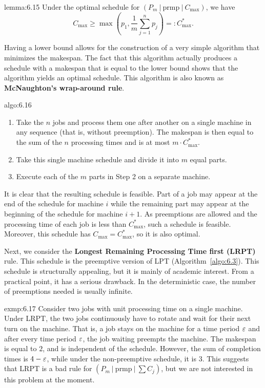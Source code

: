 \begin{lemma}{lemma:6.15}
    Under the optimal schedule for $(P_m~|~\text{prmp}~|~C_{\max})$, we have 
    \[ C_{\max} \geq \max\left( p_1, \frac1m \sum_{j=1}^n p_j \right) 
    =: C^*_{\max}. \] 
\end{lemma}

Having a lower bound allows for the construction of a very simple algorithm
that minimizes the makespan. The fact that this algorithm actually produces
a schedule with a makespan that is equal to the lower bound shows that the
algorithm yields an optimal schedule. This algorithm is also known 
as {\bf McNaughton's wrap-around rule}. 

\begin{algo}{algo:6.16}
    \begin{enumerate}
        \item Take the $n$ jobs and process them one after another on a single 
        machine in any sequence (that is, without preemption). The makespan is 
        then equal to the sum of the $n$ processing times and is at most 
        $m \cdot C^*_{\max}$.
        
        \item Take this single machine schedule and divide it into $m$ equal parts.
        
        \item Execute each of the $m$ parts in Step 2 on a separate machine. 
    \end{enumerate}
\end{algo}

It is clear that the resulting schedule is feasible. Part of a job may appear
at the end of the schedule for machine $i$ while the remaining part may appear
at the beginning of the schedule for machine $i + 1$. As preemptions are allowed
and the processing time of each job is less than $C^*_{\max}$, such a schedule 
is feasible. Moreover, this schedule has $C_{\max} = C^*_{\max}$, so it is 
also optimal. 

Next, we consider the {\bf Longest Remaining Processing Time first (LRPT)} 
rule. This schedule is the preemptive version of LPT (Algorithm~\ref{algo:6.3}).
This schedule is structurally appealing, but it is mainly of academic interest. 
From a practical point, it has a serious drawback. In the deterministic case, 
the number of preemptions needed is usually infinite. 

\begin{exmp}{exmp:6.17}
    Consider two jobs with unit processing time on a single machine. 
    Under LRPT, the two jobs continuously have to rotate and wait for their 
    next turn on the machine. That is, a job stays on the machine for a 
    time period $\varepsilon$ and after every time period $\varepsilon$, the job 
    waiting preempts the machine. The makespan is equal to $2$, and is 
    independent of the schedule. However, the sum of completion times is 
    $4 - \varepsilon$, while under the non-preemptive schedule, it is $3$. 
    This suggests that LRPT is a bad rule for $(P_m~|~\text{prmp}~|~\sum C_j)$, 
    but we are not interested in this problem at the moment. 
\end{exmp}

